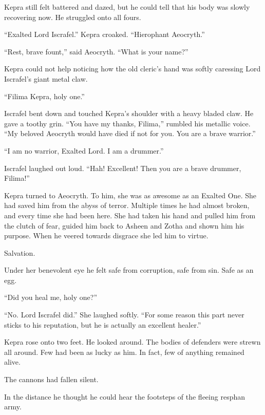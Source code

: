 \documentclass
  [a4paper,
   12pt,
   oneside
  ]%
  {article}
\begin{document}
Kepra still felt battered and dazed, but he could tell that his body was slowly recovering now. 
He struggled onto all fours. 

``Exalted Lord Iscrafel.'' Kepra croaked. ``Hierophant Aeocryth.''

``Rest, brave fount,'' said Aeocryth. ``What is your name?''

Kepra could not help noticing how the old cleric's hand was softly caressing Lord Iscrafel’s giant metal claw.

``Filima Kepra, holy one.'' 

Iscrafel bent down and touched Kepra's shoulder with a heavy bladed claw. 
He gave a toothy grin.
``You have my thanks, Filima,'' rumbled his metallic voice. ``My beloved Aeocryth would have died if not for you. You are a brave warrior.'' 

``I am no warrior, Exalted Lord. I am a drummer.''

Iscrafel laughed out loud. ``Hah! Excellent! Then you are a brave drummer, Filima!'' 

Kepra turned to Aeocryth. 
To him, she was as awesome as an Exalted One. 
She had saved him from the abyss of terror. 
Multiple times he had almost broken, and every time she had been here.
She had taken his hand and pulled him from the clutch of fear, guided him back to Asheen and Zotha and shown him his purpose.
When he veered towards disgrace she led him to virtue.

Salvation.

Under her benevolent eye he felt safe from corruption, safe from sin. Safe as an egg.

``Did you heal me, holy one?''

``No. Lord Iscrafel did.'' She laughed softly. 
``For some reason this part never sticks to his reputation, but he is actually an excellent healer.''

Kepra rose onto two feet. He looked around. 
The bodies of defenders were strewn all around. 
Few had been as lucky as him. 
In fact, few of anything remained alive. 

The cannons had fallen silent.

In the distance he thought he could hear the footsteps of the fleeing resphan army. 
\end{document}
